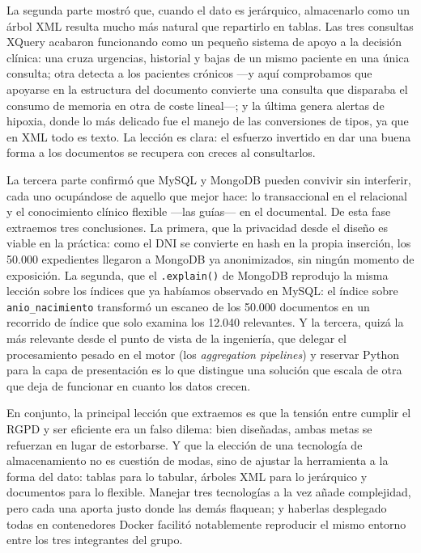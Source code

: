 \documentclass[../main.tex]{subfiles}
\begin{document}
La segunda parte mostró que, cuando el dato es jerárquico, almacenarlo como un árbol XML resulta mucho más natural que repartirlo en tablas. Las tres consultas XQuery acabaron funcionando como un pequeño sistema de apoyo a la decisión clínica: una cruza urgencias, historial y bajas de un mismo paciente en una única consulta; otra detecta a los pacientes crónicos ---y aquí comprobamos que apoyarse en la estructura del documento convierte una consulta que disparaba el consumo de memoria en otra de coste lineal---; y la última genera alertas de hipoxia, donde lo más delicado fue el manejo de las conversiones de tipos, ya que en XML todo es texto. La lección es clara: el esfuerzo invertido en dar una buena forma a los documentos se recupera con creces al consultarlos.

La tercera parte confirmó que MySQL y MongoDB pueden convivir sin interferir, cada uno ocupándose de aquello que mejor hace: lo transaccional en el relacional y el conocimiento clínico flexible ---las guías--- en el documental. De esta fase extraemos tres conclusiones. La primera, que la privacidad desde el diseño es viable en la práctica: como el DNI se convierte en hash en la propia inserción, los 50.000 expedientes llegaron a MongoDB ya anonimizados, sin ningún momento de exposición. La segunda, que el \texttt{.explain()} de MongoDB reprodujo la misma lección sobre los índices que ya habíamos observado en MySQL: el índice sobre \texttt{anio\_nacimiento} transformó un escaneo de los 50.000 documentos en un recorrido de índice que solo examina los 12.040 relevantes. Y la tercera, quizá la más relevante desde el punto de vista de la ingeniería, que delegar el procesamiento pesado en el motor (los \textit{aggregation pipelines}) y reservar Python para la capa de presentación es lo que distingue una solución que escala de otra que deja de funcionar en cuanto los datos crecen.

En conjunto, la principal lección que extraemos es que la tensión entre cumplir el RGPD y ser eficiente era un falso dilema: bien diseñadas, ambas metas se refuerzan en lugar de estorbarse. Y que la elección de una tecnología de almacenamiento no es cuestión de modas, sino de ajustar la herramienta a la forma del dato: tablas para lo tabular, árboles XML para lo jerárquico y documentos para lo flexible. Manejar tres tecnologías a la vez añade complejidad, pero cada una aporta justo donde las demás flaquean; y haberlas desplegado todas en contenedores Docker facilitó notablemente reproducir el mismo entorno entre los tres integrantes del grupo.
\end{document}

